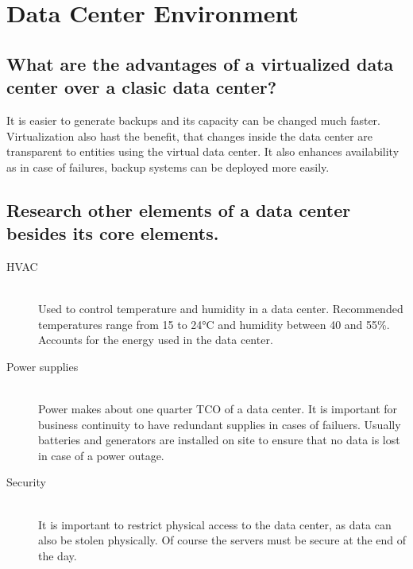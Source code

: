 \section{Data Center Environment} %
\label{sec:data_center_environment}

\subsection{What are the advantages of a virtualized data center over a clasic data center?} %
\label{sub:what_are_the_advantages_of_a_virtualized_data_center_over_a_clasic_data_center_}
	It is easier to generate backups and its capacity can be changed much faster.
	Virtualization also hast the benefit,
	that changes inside the data center are transparent to entities using the virtual data center.
	It also enhances availability as in case of failures,
	backup systems can be deployed more easily.

\subsection{Research other elements of a data center besides its core elements.} %
\label{sub:research_other_elements_of_a_data_center_besides_its_core_elements_}
	\begin{description}
		\item[HVAC] \hfill\\
			Used to control temperature  and humidity in a data center.
			Recommended temperatures range from 15 to 24°C
			and humidity between 40 and 55\%.
			Accounts for the energy used in the data center.
		\item[Power supplies] \hfill \\
			Power makes about one quarter TCO of a data center.
			It is important for business continuity to have redundant supplies in cases of failuers.
			Usually batteries and generators are installed on site
			to ensure that no data is lost in case of a power outage.
		\item[Security] \hfill \\
			It is important to restrict physical access to the data center,
			as data can also be stolen physically.
			Of course the servers must be secure at the end of the day.
	\end{description}

